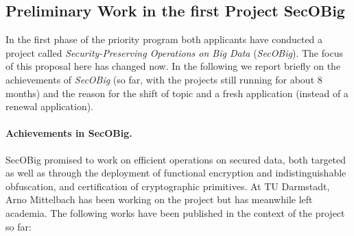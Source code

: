 \subsection{Preliminary Work in the first Project SecOBig}\label{sec:secobig}

In the first phase of the priority program both applicants have conducted a project called \emph{Security-Preserving Operations on Big Data} (\emph{SecOBig}).  The focus of this proposal here has changed now. In the following we report briefly on the achievements of \emph{SecOBig} (so far, with the projects still running for about 8 months) and the reason for the shift of topic and a fresh application (instead of a renewal application).

\paragraph{Achievements in SecOBig.}
SecOBig promised to work on efficient operations on secured data, both targeted as well as through the deployment of functional encryption and indistinguishable obfuscation, and certification of cryptographic primitives. At TU Darmstadt, Arno Mittelbach has been working on the project but has meanwhile left academia. 
%
The following works have been published in the context of the project so far: 


